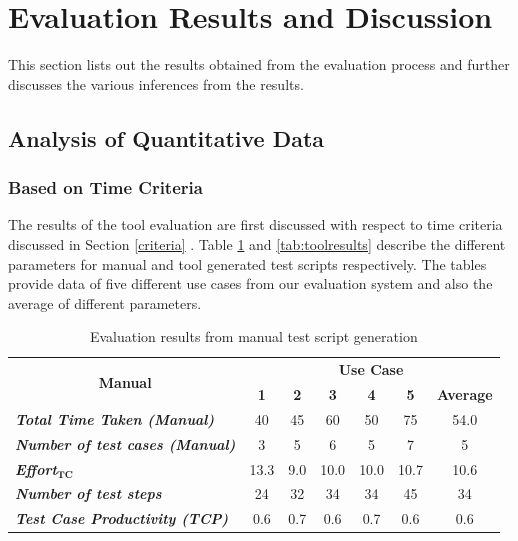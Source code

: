 \section{Evaluation Results and Discussion}
This section lists out the results obtained from the evaluation process and further discusses the various inferences from the results.
\subsection{Analysis of Quantitative Data}
\subsubsection{Based on Time Criteria}
The results of the tool evaluation are first discussed with respect to time criteria discussed in Section \ref{criteria} . Table \ref{tab:manualresults} and \ref{tab:toolresults} describe the different parameters for manual and tool generated test scripts respectively. The tables provide data of five different use cases from our evaluation system and also the average of different parameters.

\begin{table}[htbp]
  \centering
  \caption{Evaluation results from manual test script generation}
  	\begin{adjustbox}{width=1\textwidth}
    \begin{tabular}{|l|c|c|c|c|c|c|}
    \toprule
    \multicolumn{1}{|c|}{\multirow{2}[4]{*}{\textbf{Manual}}} & \multicolumn{6}{c|}{\textbf{Use Case }} \\
\cmidrule{2-7}          & \textbf{1} & \textbf{2} & \textbf{3} & \textbf{4} & \textbf{5} & \textbf{Average} \\
    \midrule
    \textit{\textbf{Total Time Taken (Manual)}} & 40    & 45    & 60    & 50    & 75    & 54.0 \\
    \midrule
    \textit{\textbf{Number of test cases (Manual) }} & 3     & 5     & 6     & 5     & 7     & 5 \\
    \midrule
    \textit{\textbf{Effort$ _{\textbf{TC}}$}} & 13.3  & 9.0   & 10.0  & 10.0  & 10.7  & 10.6 \\
    \midrule
    \textit{\textbf{Number of test steps}} & 24    & 32    & 34    & 34    & 45    & 34 \\
    \midrule
    \textit{\textbf{Test Case Productivity (TCP)}} & 0.6   & 0.7   & 0.6   & 0.7   & 0.6   & 0.6 \\
    \bottomrule
    \end{tabular}%
    \end{adjustbox}
  \label{tab:manualresults}%
\end{table}%


